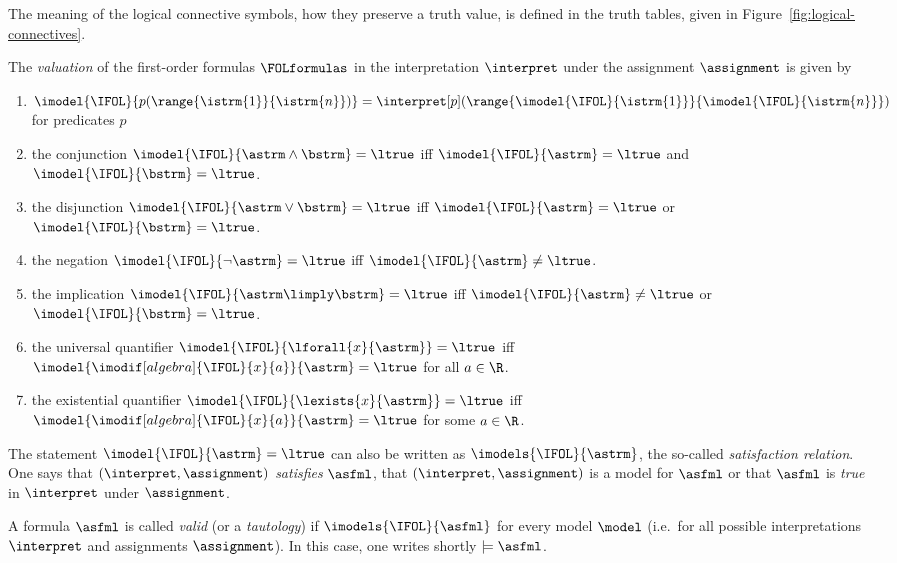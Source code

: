             The meaning of the logical connective symbols, how they preserve a truth value, is defined in the truth tables, given in Figure~\ref{fig:logical-connectives}.
            \begin{definition}
                The \emph{valuation} of the first-order formulas $\FOLformulas$ in the interpretation $\interpret$ under the assignment $\assignment$ is given by
                \begin{enumerate}
                    \item $\imodel{\IFOL}{p(\range{\istrm{1}}{\istrm{n}})} = \interpret[p](\range{\imodel{\IFOL}{\istrm{1}}}{\imodel{\IFOL}{\istrm{n}}})$ for predicates $p$
                    \item the conjunction $\imodel{\IFOL}{\astrm\land\bstrm} = \ltrue$ iff $\imodel{\IFOL}{\astrm}=\ltrue$ and $\imodel{\IFOL}{\bstrm}=\ltrue$.
                    \item the disjunction $\imodel{\IFOL}{\astrm\lor\bstrm} = \ltrue$ iff $\imodel{\IFOL}{\astrm}=\ltrue$ or $\imodel{\IFOL}{\bstrm}=\ltrue$.
                    \item the negation $\imodel{\IFOL}{\lnot\astrm} = \ltrue$ iff $\imodel{\IFOL}{\astrm} \neq \ltrue$.
                    \item the implication $\imodel{\IFOL}{\astrm\limply\bstrm} = \ltrue$ iff $\imodel{\IFOL}{\astrm} \neq \ltrue$ or $\imodel{\IFOL}{\bstrm}=\ltrue$.
                    \item the universal quantifier $\imodel{\IFOL}{\lforall{x}{\astrm}} = \ltrue$ iff $\imodel{\imodif[algebra]{\IFOL}{x}{a}}{\astrm} = \ltrue$ for all $a\in\R$.
                    \item the existential quantifier $\imodel{\IFOL}{\lexists{x}{\astrm}} = \ltrue$ iff $\imodel{\imodif[algebra]{\IFOL}{x}{a}}{\astrm} = \ltrue$ for some $a\in\R$.
                \end{enumerate}
                The statement $\imodel{\IFOL}{\astrm}=\ltrue$ can also be written as $\imodels{\IFOL}{\astrm}$, the so-called \emph{satisfaction relation}.
                One says that $(\interpret,\assignment)$ \emph{satisfies} $\asfml$, that $(\interpret,\assignment)$ is a model for $\asfml$ or that $\asfml$ is \emph{true} in $\interpret$ under $\assignment$.

                A formula $\asfml$ is called \emph{valid} (or a \emph{tautology}) if $\imodels{\IFOL}{\asfml}$ for every model $\model$ (i.e.\ for all possible interpretations $\interpret$ and assignments $\assignment$). In this case, one writes shortly $\models\asfml$.
            \end{definition}

